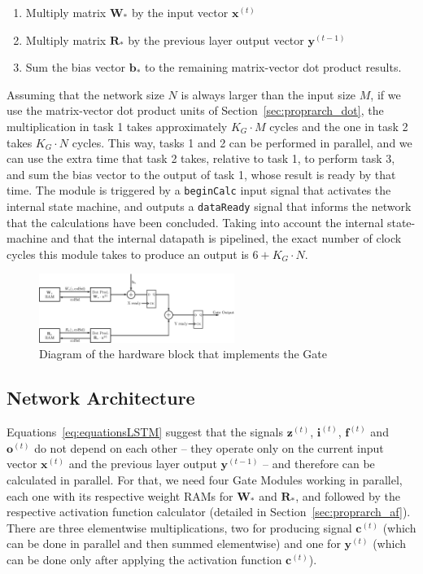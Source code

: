 \documentclass{IEEEtran}
\newcommand{\mb}[1]{\mathbf{#1}}
\begin{document}
\begin{enumerate}
    \item Multiply matrix $\mb{W}_*$ by the input vector $\mb{x}^{(t)}$
    \item Multiply matrix $\mb{R}_*$ by the previous layer output vector $\mb{y}^{(t-1)}$
    \item Sum the bias vector $\mb{b}_*$ to the remaining matrix-vector dot product results.
\end{enumerate}
Assuming that the network size $N$ is always larger than the input size $M$, if we use the matrix-vector dot product units of Section~\ref{sec:proprarch_dot}, the multiplication
in task 1 takes approximately $K_G\cdot M$ cycles and the one in task 2 takes $K_G\cdot N$ cycles. This way, tasks 1 and 2 can be performed in parallel, and we can use the extra
time that task 2 takes, relative to task 1,  to perform task 3, and sum the bias vector to the output of task 1, whose result is ready by that time. The module is triggered by a
\verb+beginCalc+ input signal that activates the internal state machine, and outputs a \verb+dataReady+ signal that informs the network that the calculations have been concluded. 
Taking into account the internal state-machine and that the internal datapath is pipelined, the exact number
of clock cycles this module takes to produce an output is $6+K_G\cdot N$.

\begin{figure}
    \centering
    \includegraphics[width=2.5in]{figures/gate.eps}
    \caption[Diagram of the hardware block that implements the Gate]{Diagram of the hardware block that implements the Gate}
    \label{fig:gate}
\end{figure}

\subsection{Network Architecture}\label{sec:proprarch_net}
Equations~\ref{eq:equationsLSTM} suggest that the signals $\mb{z}^{(t)}$, $\mb{i}^{(t)}$, $\mb{f}^{(t)}$ and $\mb{o}^{(t)}$ do not depend on each other -- they
operate only on the current input vector $\mb{x}^{(t)}$ and the previous layer output $\mb{y}^{(t-1)}$ -- and therefore can be calculated in parallel. For that, we
need four Gate Modules working in parallel, each one with its respective weight RAMs for $\mb{W}_*$ and $\mb{R}_*$, and followed by the respective activation
function calculator (detailed in Section~\ref{sec:proprarch_af}). There are three elementwise multiplications, two for producing signal $\mb{c}^{(t)}$ (which
can be done in parallel and then summed elementwise) and one for $\mb{y}^{(t)}$ (which can be done only after applying the activation function $\mb{c}^{(t)}$).
\end{document}
